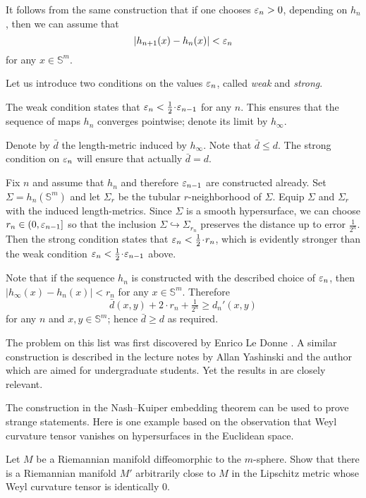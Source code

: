 It follows from the same construction that
if one chooses $\varepsilon_n>0$, depending on $h_n$,
then we can assume that 
\[|h_{n+1}(x)-h_n(x)|<\varepsilon_n\] for any $x\in \mathbb{S}^m$.

Let us introduce two conditions on the values $\varepsilon_n$, called \emph{weak} and \emph{strong}.

The weak condition states that $\eps_{n}< \tfrac1{2}\cdot \eps_{n-1}$ for any $n$.
This ensures that the sequence of maps $h_n$ converges pointwise;
denote its limit by $h_\infty$.

Denote by $\bar d$ the length-metric induced by $h_\infty$.
Note that $\bar d\le d$.
The strong condition on $\varepsilon_n$ will ensure that actually $\bar d=d$.

Fix $n$ and assume that $h_n$ and therefore $\varepsilon_{n-1}$ are constructed already.
Set $\Sigma=h_n(\mathbb{S}^m)$
and let $\Sigma_r$ be the tubular $r$-neighborhood of $\Sigma$.
Equip $\Sigma$ and $\Sigma_r$ with the induced length-metrics.
Since $\Sigma$ is a smooth hypersurface, we can choose $r_n\in(0,\varepsilon_{n-1}]$ 
so that the inclusion $\Sigma\hookrightarrow \Sigma_{r_n}$ preserves the distance up to error $\tfrac1{2^n}$.
Then the strong condition states that $\eps_n< \tfrac12\cdot r_n$, 
which is evidently stronger than the weak condition  $\eps_{n}< \tfrac1{2}\cdot \eps_{n-1}$ above.

Note that if the sequence $h_n$ is constructed with the described choice of $\varepsilon_n$,
then $|h_\infty(x)-h_n(x)|<r_n$ for any $x\in\mathbb{S}^m$.
Therefore 
\[\bar d(x,y)+2\cdot r_n+\tfrac1{2^n}\ge d_n'(x,y)\] 
for any $n$ and $x,y\in \mathbb{S}^m$;
hence $\bar d\ge d$ as required. 
\qeds


The problem
on this list was first discovered by Enrico Le Donne \cite{le-donne}.
A similar construction is described in the lecture notes by Allan Yashinski and the author \cite{petrunin-yashinsky} 
which are aimed for undergraduate students. 
Yet the results in \cite{petrunin-paths} are closely relevant.

The construction in the Nash--Kuiper embedding theorem
can be used to prove strange statements.
Here is one example based on the observation that Weyl curvature tensor 
vanishes on hypersurfaces in the Euclidean space.

\begin{pr}
Let $M$ be a Riemannian manifold diffeomorphic to the $m$-sphere. 
Show that there is a Riemannian manifold $M'$ arbitrarily close to $M$ in the Lipschitz metric whose Weyl curvature tensor is identically 0.
\end{pr}

